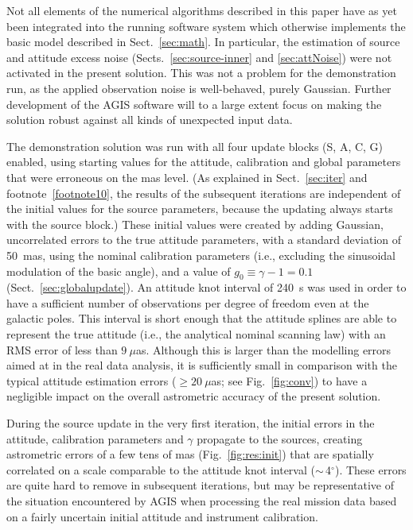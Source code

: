 \documentclass[structabstract]{aa}
\begin{document}
Not all elements of the numerical algorithms described in this paper have as yet 
been integrated into the running software system which otherwise implements
the basic model described in Sect.~\ref{sec:math}.
In particular, the estimation of source and attitude excess noise 
(Sects.~\ref{sec:source-inner} and \ref{sec:attNoise}) were not activated in 
the present solution. This was not a problem for the demonstration run, as the 
applied observation noise is well-behaved, purely Gaussian. Further
development of the AGIS software will to a large extent focus on making the 
solution robust against all kinds of unexpected input data.

The demonstration solution was run with all four update blocks (S, A, C, G) enabled,
using starting values for the attitude, calibration and global parameters that were
erroneous on the mas level. 
(As explained in Sect.~\ref{sec:iter} and footnote~\ref{footnote10},
the results of the subsequent iterations are independent of the initial values for the
source parameters, because the updating always starts with the source block.) These
initial values were created by adding Gaussian, uncorrelated errors to the
true attitude parameters, with a standard deviation of 50~mas, using the nominal 
calibration parameters (i.e., excluding the sinusoidal modulation of the basic angle), 
and a value of $g_0\equiv\gamma-1=0.1$ (Sect.~\ref{sec:globalupdate}).
An attitude knot interval of 240~s was used in order 
to have a sufficient number of observations per degree of freedom even at the galactic 
poles. This interval is short enough that the attitude splines are able to represent the
true attitude (i.e., the analytical nominal scanning law) with an RMS error 
of less than $9~\mu$as. Although this is larger than the modelling errors aimed 
at in the real data analysis, it is sufficiently small in comparison with the typical 
attitude estimation errors ($\ge 20~\mu$as; see Fig.~\ref{fig:conv}) to have a negligible 
impact on the overall astrometric accuracy of the present solution.

During the source update in the very first iteration, the initial errors in the 
attitude, calibration parameters and $\gamma$ propagate to the sources, creating 
astrometric errors of a few tens of mas (Fig.~\ref{fig:res:init}) that are spatially correlated
on a scale comparable to the attitude knot interval ($\sim\,$4$^\circ$). These
errors are quite hard to remove in subsequent iterations, but may be representative 
of the situation encountered by AGIS when processing the real mission data based on
a fairly uncertain initial attitude and instrument calibration.
\end{document}
